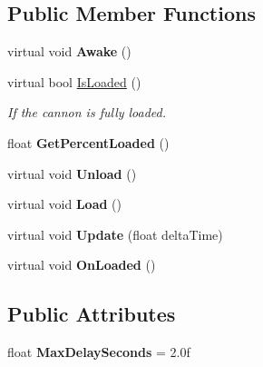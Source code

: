\subsection*{Public Member Functions}
\begin{DoxyCompactItemize}
\item 
\hypertarget{class_skyrates_1_1_misc_1_1_state_cooldown_a9a1256aa97548caa86c6b9cd5fa863fa}{virtual void {\bfseries Awake} ()}\label{class_skyrates_1_1_misc_1_1_state_cooldown_a9a1256aa97548caa86c6b9cd5fa863fa}

\item 
virtual bool \hyperlink{class_skyrates_1_1_misc_1_1_state_cooldown_a13aa170fcf5b5b2c93d8b67cfba18a87}{Is\-Loaded} ()
\begin{DoxyCompactList}\small\item\em If the cannon is fully loaded. \end{DoxyCompactList}\item 
\hypertarget{class_skyrates_1_1_misc_1_1_state_cooldown_a48f7192d4204d8558d8489774065bd64}{float {\bfseries Get\-Percent\-Loaded} ()}\label{class_skyrates_1_1_misc_1_1_state_cooldown_a48f7192d4204d8558d8489774065bd64}

\item 
\hypertarget{class_skyrates_1_1_misc_1_1_state_cooldown_a5832056d37860ad0156828d13a3e10d4}{virtual void {\bfseries Unload} ()}\label{class_skyrates_1_1_misc_1_1_state_cooldown_a5832056d37860ad0156828d13a3e10d4}

\item 
\hypertarget{class_skyrates_1_1_misc_1_1_state_cooldown_af20da6c1e9325f7e815324b0453705b2}{virtual void {\bfseries Load} ()}\label{class_skyrates_1_1_misc_1_1_state_cooldown_af20da6c1e9325f7e815324b0453705b2}

\item 
\hypertarget{class_skyrates_1_1_misc_1_1_state_cooldown_ae5d927b92b5e42a4211c5e6ed71ae820}{virtual void {\bfseries Update} (float delta\-Time)}\label{class_skyrates_1_1_misc_1_1_state_cooldown_ae5d927b92b5e42a4211c5e6ed71ae820}

\item 
\hypertarget{class_skyrates_1_1_misc_1_1_state_cooldown_ab87f7a11a7b52ce82e4589724f564dde}{virtual void {\bfseries On\-Loaded} ()}\label{class_skyrates_1_1_misc_1_1_state_cooldown_ab87f7a11a7b52ce82e4589724f564dde}

\end{DoxyCompactItemize}
\subsection*{Public Attributes}
\begin{DoxyCompactItemize}
\item 
\hypertarget{class_skyrates_1_1_misc_1_1_state_cooldown_a601fab3a0ba8b29cff2ea5f2e5f29de0}{float {\bfseries Max\-Delay\-Seconds} = 2.\-0f}\label{class_skyrates_1_1_misc_1_1_state_cooldown_a601fab3a0ba8b29cff2ea5f2e5f29de0}

\end{DoxyCompactItemize}
